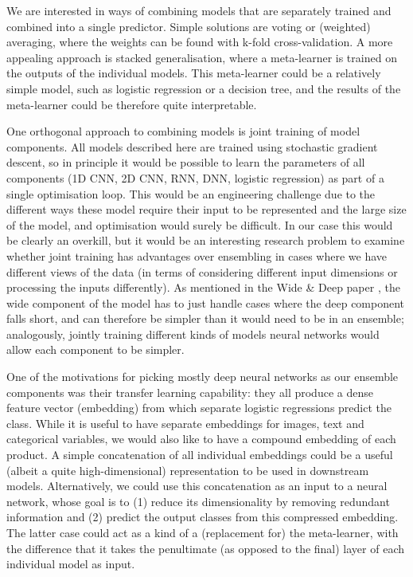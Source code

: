We are interested in ways of combining models that are separately trained and combined into a single predictor.
Simple solutions are voting or (weighted) averaging, where the weights can be found with k-fold cross-validation.
A more appealing approach is stacked generalisation, where a meta-learner is trained on the outputs of the individual models.
This meta-learner could be a relatively simple model, such as logistic regression or a decision tree, and the results of the meta-learner could be therefore quite interpretable.

One orthogonal approach to combining models is joint training of model components.
All models described here are trained using stochastic gradient descent, so in principle it would be possible to learn the parameters of all components (1D CNN, 2D CNN, RNN, DNN, logistic regression) as part of a single optimisation loop.
This would be an engineering challenge due to the different ways these model require their input to be represented and the large size of the model, and optimisation would surely be difficult.
In our case this would be clearly an overkill, but it would be an interesting research problem to examine whether joint training has advantages over ensembling in cases where we have different views of the data (in terms of considering different input dimensions or processing the inputs differently).
As mentioned in the Wide \& Deep paper \cite{wide_deep}, the wide component of the model has to just handle cases where the deep component falls short, and can therefore be simpler than it would need to be in an ensemble; analogously, jointly training different kinds of models neural networks would allow each component to be simpler.

One of the motivations for picking mostly deep neural networks as our ensemble components was their transfer learning capability: they all produce a dense feature vector (embedding) from which separate logistic regressions predict the class.
While it is useful to have separate embeddings for images, text and categorical variables, we would also like to have a compound embedding of each product.
A simple concatenation of all individual embeddings could be a useful (albeit a quite high-dimensional) representation to be used in downstream models.
Alternatively, we could use this concatenation as an input to a neural network, whose goal is to (1) reduce its dimensionality by removing redundant information and (2) predict the output classes from this compressed embedding.
The latter case could act as a kind of a (replacement for) the meta-learner, with the difference that it takes the penultimate (as opposed to the final) layer of each individual model as input.

